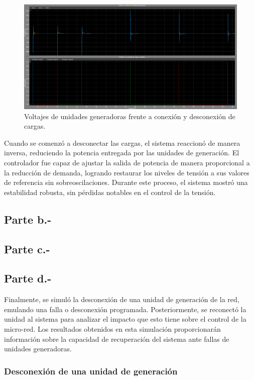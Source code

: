\begin{figure}
    \centering
    \includegraphics[width=0.5\linewidth]{Tarea 2/report/imagenes/p3a/voltajes.png}
    \caption{Voltajes de unidades generadoras frente a conexión y desconexión de cargas.}
    \label{voltaje_desconexion}
\end{figure}


Cuando se comenzó a desconectar las cargas, el sistema reaccionó de manera inversa, reduciendo la potencia entregada por las unidades de generación. El controlador fue capaz de ajustar la salida de potencia de manera proporcional a la reducción de demanda, logrando restaurar los niveles de tensión a sus valores de referencia sin sobreoscilaciones. Durante este proceso, el sistema mostró una estabilidad robusta, sin pérdidas notables en el control de la tensión.

\subsection{Parte b.-}



\subsection{Parte c.-}


\subsection{Parte d.-}

Finalmente, se simuló la desconexión de una unidad de generación de la red, emulando una falla o desconexión programada. Posteriormente, se reconectó la unidad al sistema para analizar el impacto que esto tiene sobre el control de la micro-red. Los resultados obtenidos en esta simulación proporcionarán información sobre la capacidad de recuperación del sistema ante fallas de unidades generadoras.

\subsubsection{Desconexión de una unidad de generación}

